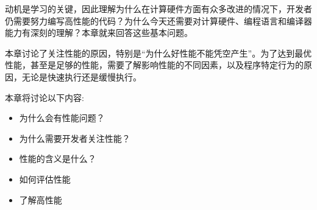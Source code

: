 动机是学习的关键，因此理解为什么在计算硬件方面有众多改进的情况下，开发者仍需要努力编写高性能的代码？为什么今天还需要对计算硬件、编程语言和编译器能力有深刻的理解？本章就来回答这些基本问题。

本章讨论了关注性能的原因，特别是“为什么好性能不能凭空产生”。为了达到最优性能，甚至是足够的性能，需要了解影响性能的不同因素，以及程序特定行为的原因，无论是快速执行还是缓慢执行。

本章将讨论以下内容:

\begin{itemize}
\item 为什么会有性能问题？
\item 为什么需要开发者关注性能？
\item 性能的含义是什么？
\item 如何评估性能
\item 了解高性能
\end{itemize}














